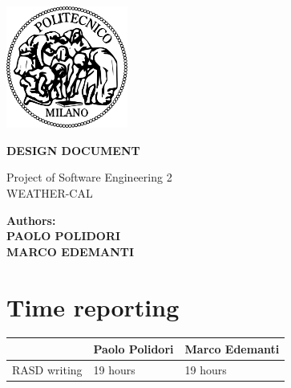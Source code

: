 \documentclass[a4paper,12pt]{book}
\begin{document}
 \begin{center}
    \includegraphics[width=4cm]{../RASD/immagini/polilogo.png}
    \end{center}
\begin{center}

{\huge{\bf\uppercase {Design Document}}}


\end{center}
\vspace*{0.5cm}
\begin{center}
{\large Project of Software Engineering 2\\ \vspace*{0.5cm} \huge WEATHER-CAL}
\end{center}
\begin{flushright}
 \vspace*{9cm}

        {\bf Authors: }\\
        \vspace*{0.2cm}
            {\bf   {PAOLO POLIDORI} }\\
             \vspace*{0.3cm}
            {\bf   {MARCO EDEMANTI} }
    \end{flushright}

\doublespacing    
\tableofcontents




\chapter*{Time reporting}
\begin{tabularx}{\linewidth}{|r|X|X|}
  \hline  & {\bf Paolo Polidori} & {\bf Marco Edemanti}\\
  \hline RASD writing & 19 hours & 19 hours\\
  \hline
\end{tabularx}\\
\listoffigures
\lstlistoflistings
\end{document}
